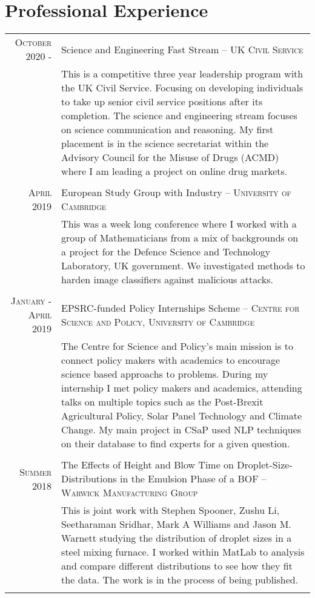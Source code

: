\documentclass[a4paper,10pt]{article}
\begin{document}
\section{Professional Experience}
\begin{tabular}{r|p{14.2 cm}}
\textsc{October 2020 -} & Science and Engineering Fast Stream -- \textsc{UK Civil Service}\\&\footnotesize{This is a competitive three year leadership program with the UK Civil Service. Focusing on developing individuals to take up senior civil service positions after its completion. The science and engineering stream focuses on science communication and reasoning. My first placement is in the science secretariat within the Advisory Council for the Misuse of Drugs (ACMD) where I am leading a project on online drug markets.}\\\multicolumn{2}{c}{} \\
\textsc{April 2019} & European Study Group with Industry -- \textsc{University of Cambridge}\\&\footnotesize{This was a week long conference where I worked with a group of Mathematicians from a mix of backgrounds on a project for the Defence Science and Technology Laboratory, UK government. We investigated methods to harden image classifiers against malicious attacks.}\\\multicolumn{2}{c}{} \\
\textsc{January - April 2019} & EPSRC-funded Policy Internships Scheme -- \textsc{Centre for Science and Policy, University of Cambridge}\\&\footnotesize{The Centre for Science and Policy's main mission is to connect policy makers with academics to encourage science based approachs to problems. During my internship I met policy makers and academics, attending talks on multiple topics such as the Post-Brexit Agricultural Policy, Solar Panel Technology and Climate Change. My main project in CSaP used NLP techniques on their database to find experts for a given question.}\\\multicolumn{2}{c}{} \\
\textsc{Summer 2018} & The Effects of Height and Blow Time on Droplet-Size-Distributions in the Emulsion Phase of a BOF -- \textsc{Warwick Manufacturing Group}\\&\footnotesize{This is joint work with Stephen Spooner, Zushu Li, Seetharaman Sridhar, Mark A Williams and Jason M. Warnett studying the distribution of droplet sizes in a steel mixing furnace. I worked within MatLab to analysis and compare different distributions to see how they fit the data. The work is in the process of being published.}\\\multicolumn{2}{c}{} \\

\end{tabular}
\end{document}

